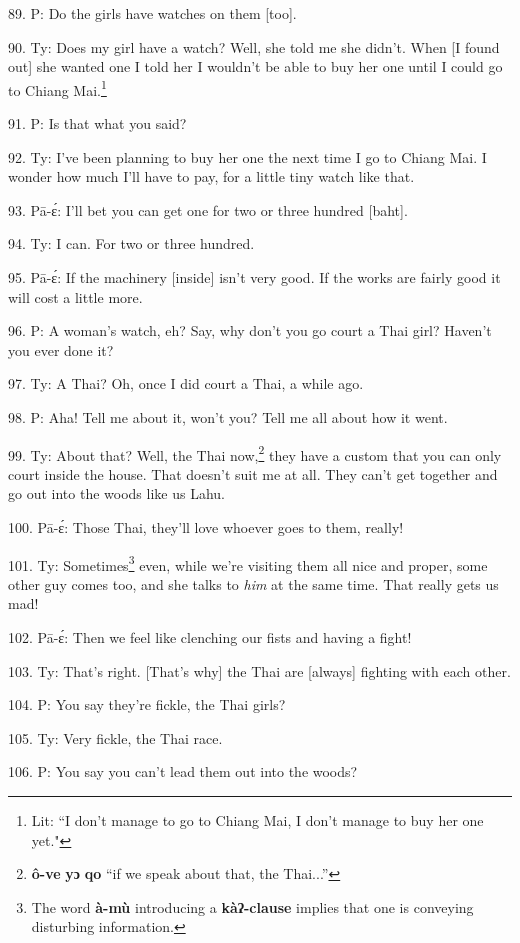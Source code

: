 89. P: Do the girls have watches on them [too].

90. Ty: Does my girl have a watch? Well, she told me she didn't. When [I found
out] she wanted one I told her I wouldn't be able to buy her one until I could
go to Chiang Mai.\footnote{Lit: ``I don't manage to go to Chiang Mai, I don't manage to buy her one yet."}

91. P: Is that what you said?

92. Ty: I've been planning to buy her one the next time I go to Chiang Mai.
I wonder how much I'll have to pay, for a little tiny watch like that.

93. Pā-ɛ́: I'll bet you can get one for two or three hundred [baht].

94. Ty: I can. For two or three hundred.

95. Pā-ɛ́: If the machinery [inside] isn't very good. If the works are fairly
good it will cost a little more.

96. P: A woman's watch, eh? Say, why don't you go court a Thai girl? Haven't
you ever done it?

97. Ty: A Thai? Oh, once I did court a Thai, a while ago.

98. P: Aha! Tell me about it, won't you? Tell me all about how it went.

99. Ty: About that? Well, the Thai now,\footnote{\textbf{ô-ve} \textbf{yɔ} \textbf{qo} ``if we speak about that, the Thai...''} they have a custom that you can
only court inside the house. That doesn't suit me at all. They can't get together
and go out into the woods like us Lahu.

100. Pā-ɛ́: Those Thai, they'll love whoever goes to them, really!

101. Ty: Sometimes\footnote{The word \textbf{à-mù} introducing a \textbf{kàʔ-clause} implies that one is conveying disturbing information.} even, while we're visiting them all nice and proper,
some other guy comes too, and she talks to \textit{him} at the same time. That
really gets us mad!

102. Pā-ɛ́: Then we feel like clenching our fists and having a fight!

103. Ty: That's right. [That's why] the Thai are [always] fighting with each
other.

104. P: You say they're fickle, the Thai girls?

105. Ty: Very fickle, the Thai race.

106. P: You say you can't lead them out into the woods?

